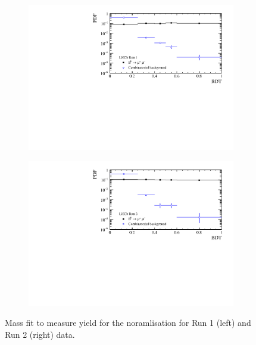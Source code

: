 \begin{figure}[htbp]
    \centering
   \begin{subfigure}[b]{0.4\textwidth}
        \includegraphics[width=  \textwidth]{./Figs/BFAnalysis/Bd2KPi_BDTCalibration_RunI.pdf}
    \end{subfigure}
    \begin{subfigure}[b]{0.4\textwidth}
       \includegraphics[width=\textwidth]{./Figs/BFAnalysis/Bd2KPi_BDTCalibration_RunII.pdf}
   \end{subfigure}
    \caption{ Mass fit to measure \bujpsik yield for the noramlisation for Run 1 (left) and Run 2 (right) data.}
    \label{fig:Bujpsikyield}
\end{figure}


